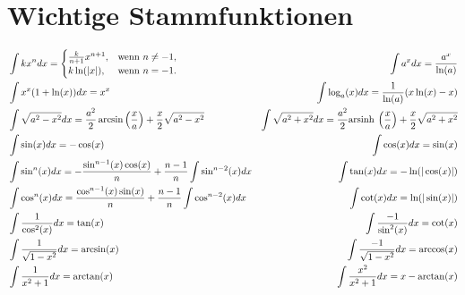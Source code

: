 \documentclass{article}
\begin{document}
\section*{Wichtige Stammfunktionen}
\begin{align*}
  &\int kx^n dx = \begin{cases} \frac{k}{n+1}x^{n+1}, & \text{wenn } n \neq -1, \\
  k\ln (|x|), & \text{wenn } n = -1.
\end{cases}
 &\int a^x dx = \frac{a^x}{\ln (a)} \\
 &\int x^x(1+\ln(x)) dx = x^x
 &\int \log_a(x) dx = \frac{1}{\ln(a)}(x\ln(x) - x) \\
 &\int \sqrt{a^2-x^2} dx = \frac{a^2}{2}\arcsin \left(\frac{x}{a}\right) + \frac{x}{2}\sqrt{a^2-x^2}
 &\int \sqrt{a^2+x^2} dx = \frac{a^2}{2}\mathrm{arsinh} \: \left(\frac{x}{a}\right) + \frac{x}{2}\sqrt{a^2+x^2} \\
 &\int \sin(x) dx = -\cos(x)
 &\int \cos(x) dx = \sin(x) \\
 &\int \sin^n(x) dx = -\frac{\sin^{n-1}(x) \cos(x)}{n} + \frac{n - 1}{n} \int \sin^{n-2}(x) dx
 &\int \tan(x) dx = -\ln(|\cos(x)|)\\
 &\int \cos^n(x) dx =  \frac{\cos^{n-1}(x) \sin(x)}{n} + \frac{n - 1}{n} \int \cos^{n-2}(x) dx
 &\int \cot(x) dx = \ln(|\sin(x)|) \\
 &\int \frac{1}{\cos^2(x)} dx = \tan(x)
 &\int \frac{-1}{\sin^2(x)} dx = \cot(x) \\
 &\int \frac{1}{\sqrt{1-x^2}} dx = \arcsin(x)
 &\int \frac{-1}{\sqrt{1-x^2}} dx = \arccos(x) \\
 &\int \frac{1}{x^2 + 1} dx =  \arctan(x)
 &\int \frac{x^2}{x^2 + 1} dx = x - \arctan(x) \\
\end{align*}
\end{document}
